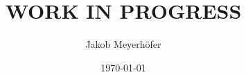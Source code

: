     \title{WORK IN PROGRESS}

    \author{Jakob Meyerhöfer}
    \newcommand{\mail}{meyerhoe@rptu.de}
    \newcommand{\city}{Rodalben}

    \date{\today}

    \newcommand{\examinerA}{Prof. Dr. Ralf Hinze}
    \newcommand{\examinerB}{Cass Alexandru (Gregor Cassian Alexandru), M.Sc.}

    \newcommand{\thesisType}{Bachelor}
